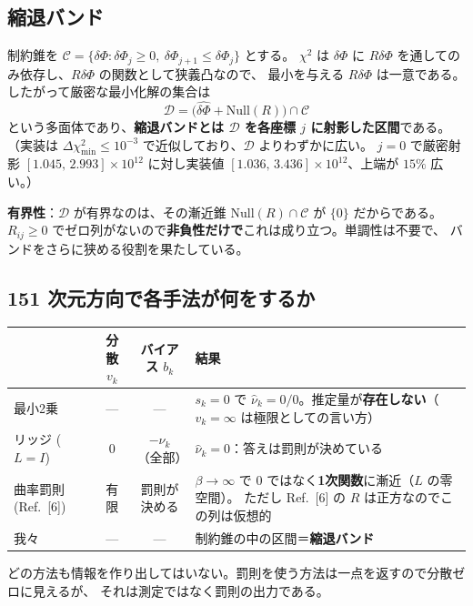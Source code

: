\documentclass[11pt,a4paper]{ltjsarticle}
\newcommand{\dP}{\delta\Phi}
\newcommand{\dPh}{\widehat{\delta\Phi}}
\begin{document}
\subsection{縮退バンド}
制約錐を $\mathcal{C}=\{\dP:\dP_j\ge0,\ \dP_{j+1}\le\dP_j\}$ とする。
$\chi^2$ は $\dP$ に $R\dP$ を通してのみ依存し、$R\dP$ の関数として狭義凸なので、
最小を与える $R\dP$ は一意である。したがって厳密な最小化解の集合は
\begin{equation}
\mathcal{D}=\big(\dPh+\mathrm{Null}(R)\big)\cap\mathcal{C}
\end{equation}
という多面体であり、\textbf{縮退バンドとは $\mathcal{D}$ を各座標 $j$ に射影した区間}である。
（実装は $\Delta\chi^2_{\min}\le10^{-3}$ で近似しており、$\mathcal{D}$ よりわずかに広い。
$j=0$ で厳密射影 $[1.045,\,2.993]\times10^{12}$ に対し実装値 $[1.036,\,3.436]\times10^{12}$、上端が $15\%$ 広い。）

\textbf{有界性}：$\mathcal{D}$ が有界なのは、その漸近錐 $\mathrm{Null}(R)\cap\mathcal{C}$ が $\{0\}$ だからである。
$R_{ij}\ge0$ でゼロ列がないので\textbf{非負性だけで}これは成り立つ。単調性は不要で、
バンドをさらに狭める役割を果たしている。

\subsection{151 次元方向で各手法が何をするか}
\begin{center}\small
\begin{tabular}{lccp{}}
\toprule
 & 分散 $v_k$ & バイアス $b_k$ & 結果 \\
\midrule
最小2乗 & --- & --- & $s_k=0$ で $\hat\nu_k=0/0$。推定量が\textbf{存在しない}（$v_k=\infty$ は極限としての言い方）\\[2pt]
リッジ ($L=I$) & $0$ & $-\nu_k$（全部） & $\hat\nu_k=0$：答えは罰則が決めている \\[2pt]
曲率罰則 (Ref.~[6]) & 有限 & 罰則が決める & $\beta\to\infty$ で 0 ではなく\textbf{1次関数}に漸近（$L$ の零空間）。
ただし Ref.~[6] の $R$ は正方なのでこの列は仮想的 \\[2pt]
我々 & --- & --- & 制約錐の中の区間＝\textbf{縮退バンド} \\
\bottomrule
\end{tabular}
\end{center}
どの方法も情報を作り出してはいない。罰則を使う方法は一点を返すので分散ゼロに見えるが、
それは測定ではなく罰則の出力である。
\end{document}
